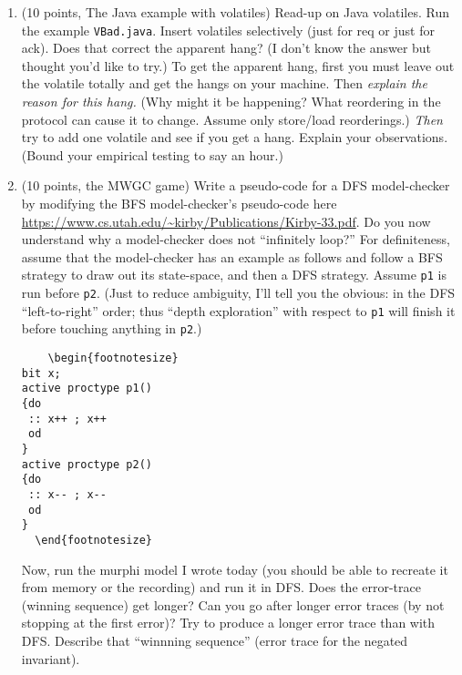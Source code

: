 \documentclass[11pt]{article}
\begin{document}
\begin{enumerate}
\item (10 points, The Java example with volatiles)
  Read-up on Java volatiles. Run the example \verb|VBad.java|.
  Insert volatiles selectively (just for req or just for ack).
  Does that correct the apparent hang? (I don't know the answer
  but thought you'd like to try.) To get the apparent hang,
  first you must leave out the volatile totally and get the
  hangs on your machine.
  Then {\em explain the reason for this hang.} (Why might it be
  happening? What reordering in the protocol can cause it to
  change. Assume only store/load reorderings.\footnotemark)
  {\em Then} try to add one volatile
  and see if you get a hang. Explain your observations. (Bound
  your empirical testing to say an hour.)

  \begin{minipage}{\minpagw}
  \end{minipage}


\item (10 points, the MWGC game)
  Write a pseudo-code for a DFS model-checker by modifying the BFS model-checker's
  pseudo-code here
  \url{https://www.cs.utah.edu/~kirby/Publications/Kirby-33.pdf}.
  Do you now understand why a model-checker does not ``infinitely loop?''
  For definiteness, assume that the model-checker has an example as follows
  and follow a BFS strategy to draw out its state-space, and then a DFS
  strategy.
  Assume {\tt p1} is run before {\tt p2}. (Just to
  reduce ambiguity, I'll tell you
  the obvious: in the DFS ``left-to-right'' order;
  thus ``depth exploration'' with respect to {\tt p1} will finish it before
  touching anything in {\tt p2}.)
  \begin{verbatim}
    \begin{footnotesize}
bit x;
active proctype p1()
{do
 :: x++ ; x++ 
 od
}
active proctype p2()
{do
 :: x-- ; x-- 
 od
}
  \end{footnotesize}
  \end{verbatim}
  Now, run the murphi model I wrote today (you should be able to recreate it from
  memory or the recording) and run it in DFS.
  Does the error-trace (winning sequence) get longer?
  Can you go after longer error traces (by not stopping at the first error)?
  Try to produce a longer error trace than with DFS.
  Describe that ``winnning sequence'' (error trace for the negated invariant).


\end{enumerate}
\end{document}
